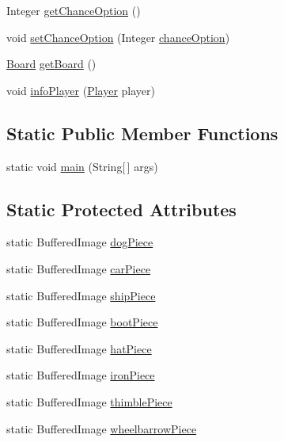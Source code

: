 \begin{DoxyCompactItemize}
Integer \hyperlink{class_monopoly_1_1_logic_1_1_game_a12cdb08d22a6f78a80aa06bf4c98a8ad}{get\+Chance\+Option} ()
\item 
void \hyperlink{class_monopoly_1_1_logic_1_1_game_a0a4fe65f77786ddee21709784b422b0a}{set\+Chance\+Option} (Integer \hyperlink{class_monopoly_1_1_logic_1_1_game_a31a86909fac3b9813f640e1bde0dca67}{chance\+Option})
\item 
\hyperlink{class_monopoly_1_1_logic_1_1_board}{Board} \hyperlink{class_monopoly_1_1_logic_1_1_game_a01038718bb0a616035e99f9130f29b05}{get\+Board} ()
\item 
void \hyperlink{class_monopoly_1_1_logic_1_1_game_a8a78d2936440a32aa15b52cd90b0dd9b}{info\+Player} (\hyperlink{class_monopoly_1_1_logic_1_1_player}{Player} player)
\end{DoxyCompactItemize}
\subsection*{Static Public Member Functions}
\begin{DoxyCompactItemize}
\item 
static void \hyperlink{class_monopoly_1_1_logic_1_1_game_a944fe39164dad94b2db385b2b501f6a3}{main} (String\mbox{[}$\,$\mbox{]} args)
\end{DoxyCompactItemize}
\subsection*{Static Protected Attributes}
\begin{DoxyCompactItemize}
\item 
static Buffered\+Image \hyperlink{class_monopoly_1_1_logic_1_1_game_a82b844adcf008c16a9a93989965040c3}{dog\+Piece}
\item 
static Buffered\+Image \hyperlink{class_monopoly_1_1_logic_1_1_game_abeedc4029b760c065483e1d808e7a091}{car\+Piece}
\item 
static Buffered\+Image \hyperlink{class_monopoly_1_1_logic_1_1_game_ab84d4d846a47154e872a4e2498c2d72d}{ship\+Piece}
\item 
static Buffered\+Image \hyperlink{class_monopoly_1_1_logic_1_1_game_af5f0a46238effac27049e9c7136333e4}{boot\+Piece}
\item 
static Buffered\+Image \hyperlink{class_monopoly_1_1_logic_1_1_game_aa61ba9fcff6fbe176fe1506eb5486096}{hat\+Piece}
\item 
static Buffered\+Image \hyperlink{class_monopoly_1_1_logic_1_1_game_a6b695620411787654c8f02264d57d2ae}{iron\+Piece}
\item 
static Buffered\+Image \hyperlink{class_monopoly_1_1_logic_1_1_game_ac35a4e38762abc0ea54d062f7cde7643}{thimble\+Piece}
\item 
static Buffered\+Image \hyperlink{class_monopoly_1_1_logic_1_1_game_aa420c0448988b31e3b43a7181fbf957f}{wheelbarrow\+Piece}
\end{DoxyCompactItemize}
